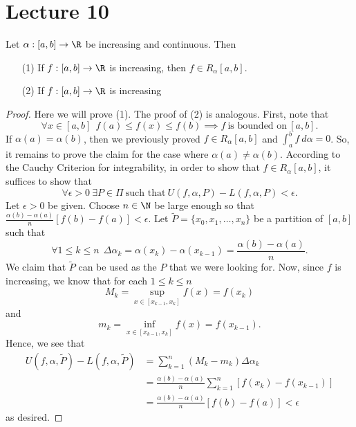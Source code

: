 \section{Lecture 10}

\begin{theorem}[Rudin 6.9]\label{Rudin 6.9}
    Let \( \alpha: [a,b] \to \R  \) be increasing and continuous. Then 
    \begin{enumerate}
        \item[(1)] If \( f:[a,b] \to \R  \) is increasing, then \( f \in {R}_{\alpha}[a,b] \).
        \item[(2)] If \( f: [a,b] \to \R  \) is increasing
    \end{enumerate}
\end{theorem}
\begin{proof}
Here we will prove (1). The proof of (2) is analogous. First, note that
\[  \forall x \in [a,b] \ \ f(a) \leq f(x) \leq f(b)  \implies f \ \text{is bounded on} \ [a,b].\]
If \( \alpha(a) = \alpha(b) \), then we previously proved \( f \in {R}_{\alpha}[a,b] \) and \( \int_{ a }^{ b }  f  \ d \alpha = 0  \). So, it remains to prove the claim for the case where \( \alpha(a) \neq \alpha(b) \). According to the Cauchy Criterion for integrability, in order to show that \( f \in {R}_{\alpha}[a,b]  \), it suffices to show that
\[  \forall \epsilon > 0 \ \exists P \in \Pi \ \text{such that} \ U(f,\alpha, P) - L(f,\alpha, P) < \epsilon.  \]
Let \( \epsilon > 0  \) be given. Choose \( n \in \N \) be large enough so that \( \frac{ \alpha(b) - \alpha(a)  }{ n  }  [f(b) - f(a)] < \epsilon \). Let \( \tilde{P} = \{  x_{0}, {x}_{1}, \dots, {x}_{n} \}  \) be a partition of \( [a,b] \) such that 
\[  \forall 1 \leq k \leq n \ \ \Delta {\alpha}_{k} = \alpha({x}_{k}) - \alpha({x}_{k-1}) = \frac{ \alpha(b) - \alpha(a) }{  n  }. \]
We claim that \( \tilde{P} \) can be used as the \( P  \) that we were looking for. Now, since \( f  \) is increasing, we know that for each \( 1 \leq  k \leq n  \)
\[  {M}_{k} = \sup_{x \in [{x}_{k-1}, {x}_{k}]} f(x) = f({x}_{k}) \]
and
\[  {m}_{k } = \inf_{x \in [{x}_{k-1}, {x}_{k}]} f(x) = f({x}_{k-1}). \]
Hence, we see that 
\begin{align*}
    U(f,\alpha, \tilde{P}) - L(f,\alpha, \tilde{P})  &= \sum_{ k=1  }^{ n } ({M}_{k } - {m}_{k}) \Delta {\alpha}_{k }  \\
                                                     &= \frac{ \alpha(b) - \alpha(a) }{ n }  \sum_{ k=1  }^{ n } [f({x}_{k}) - f({x}_{k-1})] \\
                                                     &= \frac{ \alpha(b) - \alpha(a) }{  n }  [f(b) - f(a)] < \epsilon
\end{align*}
as desired.
\end{proof}

